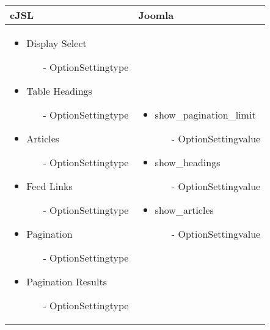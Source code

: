 \begin{minipage}{0.63\textwidth}
\begin{tabular}{|p{} | p{}|}
\hline
\textbf{cJSL} & \textbf{Joomla} \\ 
\hline
\begin{itemize}
\item Display Select
\begin{enumerate}
    \item[-] OptionSettingtype
 \end{enumerate} 
\item Table Headings
\begin{enumerate}
    \item[-] OptionSettingtype
 \end{enumerate} 
\item  Articles
\begin{enumerate}
    \item[-] OptionSettingtype
 \end{enumerate} 
\item Feed Links
\begin{enumerate}
    \item[-] OptionSettingtype
 \end{enumerate} 
\item Pagination
\begin{enumerate}
    \item[-] OptionSettingtype
 \end{enumerate} 
\item Pagination Results
\begin{enumerate}
    \item[-] OptionSettingtype
 \end{enumerate} 
\end{itemize}
 & 
\begin{itemize}
\item show\_pagination\_limit
 \begin{enumerate}
    \item[-] OptionSettingvalue
 \end{enumerate} 
\item show\_headings
 \begin{enumerate}
    \item[-] OptionSettingvalue
 \end{enumerate} 
\item show\_articles
 \begin{enumerate}
    \item[-] OptionSettingvalue

\end{enumerate}
\end{itemize}
\end{tabular}
\end{minipage}
